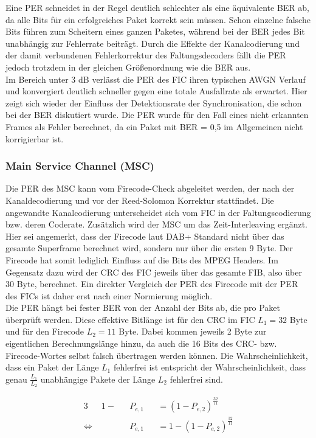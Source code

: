 Eine PER schneidet in der Regel deutlich schlechter als eine äquivalente BER ab, da alle Bits für ein erfolgreiches Paket korrekt sein müssen. Schon einzelne falsche Bits führen zum Scheitern eines ganzen Paketes, während bei der BER jedes Bit unabhängig zur Fehlerrate beiträgt. Durch die Effekte der Kanalcodierung und der damit verbundenen Fehlerkorrektur des Faltungsdecoders fällt die PER jedoch trotzdem in der gleichen Größenordnung wie die BER aus. \\
Im Bereich unter 3 dB verlässt die PER des FIC ihren typischen AWGN Verlauf und konvergiert deutlich schneller gegen eine totale Ausfallrate als erwartet. Hier zeigt sich wieder der Einfluss der Detektionsrate der Synchronisation, die schon bei der BER diskutiert wurde. Die PER wurde für den Fall eines nicht erkannten Frames als Fehler berechnet, da ein Paket mit BER = 0,5 im Allgemeinen nicht korrigierbar ist.\\
\subsubsection{Main Service Channel (MSC)}
Die PER des MSC kann vom Firecode-Check abgeleitet werden, der nach der Kanaldecodierung und vor der Reed-Solomon Korrektur stattfindet. Die angewandte Kanalcodierung unterscheidet sich vom FIC in der Faltungscodierung bzw. deren Coderate. Zusätzlich wird der MSC um das Zeit-Interleaving ergänzt.\\
Hier sei angemerkt, dass der Firecode laut DAB+ Standard nicht über das gesamte Superframe berechnet wird, sondern nur über die ersten 9 Byte. Der Firecode hat somit lediglich Einfluss auf die Bits des MPEG Headers. Im Gegensatz dazu wird der CRC des FIC jeweils über das gesamte FIB, also über 30 Byte, berechnet. Ein direkter Vergleich der PER des Firecode mit der PER des FICs ist daher erst nach einer Normierung möglich.\\
Die PER hängt bei fester BER von der Anzahl der Bits ab, die pro Paket überprüft werden. Diese effektive Bitlänge ist für den CRC im FIC $L_1 = 32$ Byte und für den Firecode $L_2 = 11$ Byte. Dabei kommen jeweils 2 Byte zur eigentlichen Berechnungslänge hinzu, da auch die 16 Bits des CRC- bzw. Firecode-Wortes selbst falsch übertragen werden können. Die Wahrscheinlichkeit, dass ein Paket der Länge $L_1$ fehlerfrei ist entspricht der Wahrscheinlichkeit, dass genau $\frac{L_1}{L_2}$ unabhängige Pakete der Länge $L_2$ fehlerfrei sind.

\begin{alignat}{3}
&1-&&P_{e,1} &&= (1-P_{e,2})^\frac{32}{11}\nonumber \\
\Leftrightarrow\; & &&P_{e,1} &&= 1 - (1-P_{e,2})^{\frac{32}{11}} \label{eq:per}
\end{alignat}

